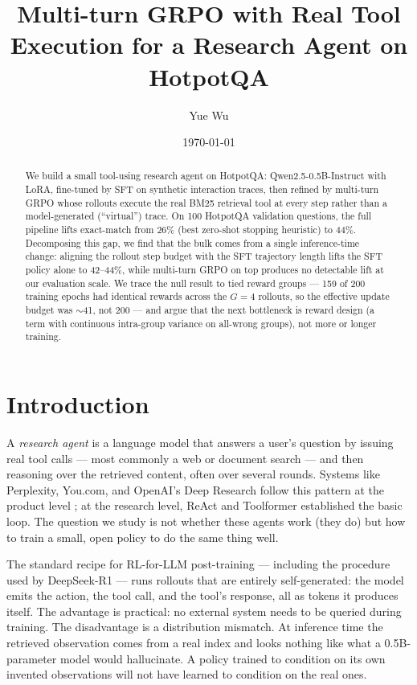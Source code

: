 \documentclass[11pt]{article}
\title{Multi-turn GRPO with Real Tool Execution for a Research Agent on HotpotQA}
\author{Yue Wu}
\date{\today}
\begin{document}
\maketitle

\begin{abstract}
We build a small tool-using research agent on HotpotQA:
Qwen2.5-0.5B-Instruct with LoRA, fine-tuned by SFT on synthetic
interaction traces, then refined by multi-turn GRPO whose rollouts
execute the real BM25 retrieval tool at every step rather than a
model-generated (``virtual'') trace. On 100 HotpotQA validation
questions, the full pipeline lifts exact-match from 26\% (best
zero-shot stopping heuristic) to 44\%. Decomposing this gap, we
find that the bulk comes from a single inference-time change:
aligning the rollout step budget with the SFT trajectory length
lifts the SFT policy alone to 42--44\%, while multi-turn GRPO on
top produces no detectable lift at our evaluation scale. We trace
the null result to tied reward groups --- 159 of 200 training
epochs had identical rewards across the $G{=}4$ rollouts, so the
effective update budget was $\sim$41, not 200 --- and argue that
the next bottleneck is reward design (a term with continuous
intra-group variance on all-wrong groups), not more or longer
training.
\end{abstract}

\section{Introduction}
\label{sec:intro}

A \emph{research agent} is a language model that answers a user's
question by issuing real tool calls --- most commonly a web or document
search --- and then reasoning over the retrieved content, often over
several rounds. Systems like Perplexity, You.com, and OpenAI's Deep
Research follow this pattern at the product level \cite{deep-research};
at the research level, ReAct \cite{react} and Toolformer
\cite{toolformer} established the basic loop. The question we study
is not whether these agents work (they do) but how to train a small,
open policy to do the same thing well.

The standard recipe for RL-for-LLM post-training --- including the
procedure used by DeepSeek-R1 \cite{deepseek-r1} --- runs rollouts
that are entirely self-generated: the model emits the action, the tool
call, and the tool's response, all as tokens it produces itself. The
advantage is practical: no external system needs to be queried during
training. The disadvantage is a distribution mismatch. At inference time
the retrieved observation comes from a real index and looks nothing like
what a 0.5B-parameter model would hallucinate. A policy trained to
condition on its own invented observations will not have learned to
condition on the real ones.
\end{document}

